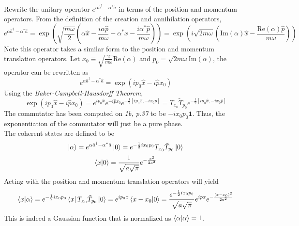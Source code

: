\begin{sol}
Rewrite the unitary operator $e^{\alpha\hat a^\dagger-\alpha^*\hat a}$ in terms of the position and momentum operators. From the definition of the creation and annihilation operators,
\begin{equation}
	e^{\alpha\hat a^\dagger-\alpha^*\hat a}=\exp\left(\sqrt{\frac{m\omega}{2}}\left(\alpha\hat x-\frac{i\alpha\hat p}{m\omega}-\alpha^*\hat x-\frac{i\alpha^*\hat p}{m\omega}\right)\right)=\exp\left(i\sqrt{2m\omega}\left(\text{Im}(\alpha)\hat x-\frac{\text{Re}(\alpha)\hat p}{m\omega}\right)\right)
\end{equation}
Note this operator takes a similar form to the position and momentum translation operators. Let $x_0\equiv\sqrt{\frac{2}{m\omega}}\text{Re}(\alpha)$ and $p_0=\sqrt{2m\omega}\text{Im}(\alpha)$, the operator can be rewritten as
\begin{equation}
	e^{\alpha\hat a^\dagger-\alpha^*\hat a}=\exp(ip_0\hat x-i\hat px_0)
\end{equation}
Using the \textit{Baker-Campbell-Hausdorff Theorem}, 
\begin{equation}
	\exp(ip_0\hat x-i\hat px_0)=e^{ip_0\hat x}e^{-i\hat px_0}e^{-\frac{1}{2}[ip_0\hat x,-ix_0\hat p]}=T_{x_0}\tilde {T}_{p_0}e^{-\frac{1}{2}[ip_0\hat x,-ix_0\hat p]}
\end{equation} 
The commutator has been computed on \textit{1b, p.37} to be $-ix_0p_0\mathbf{1}$. Thus, the exponentiation of the commutator will just be a pure phase.\\
The coherent states are defined to be
\begin{equation}
	\ket\alpha=e^{\alpha\hat a^\dagger-\alpha^*\hat a}\ket 0=e^{-\frac{1}{2}ix_0p_0}T_{x_0}\tilde {T}_{p_0}\ket 0
\end{equation} 
\begin{equation}
	\braket{x}{0}=\frac{1}{\sqrt{a\sqrt{\pi}}}e^{-\frac{x^2}{2a^2}}
\end{equation}
Acting with the position and momentum translation operators will yield
\begin{equation}
	\braket{x}{\alpha}=e^{-\frac{1}{2}ix_0p_0}\bra xT_{x_0}\tilde {T}_{p_0}\ket 0=e^{ip_0x}\braket{x-x_0}{0}=\frac{e^{-\frac{1}{2}ix_0p_0}}{\sqrt{a\sqrt{\pi}}}e^{ipx}e^{-\frac{(x-x_0)^2}{2a^2}}
\end{equation} 
This is indeed a Gaussian function that is normalized as $\braket{\alpha}{\alpha}=1$.
\end{sol}